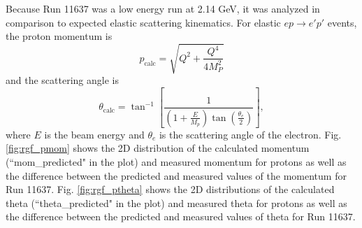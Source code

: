 Because Run 11637 was a low energy run at 2.14 GeV, it was analyzed in comparison to expected elastic scattering kinematics. For elastic $ep\rightarrow e'p'$ events, the proton momentum is
\begin{equation}
p_{\mathrm{calc}} = \sqrt{Q^2+\frac{Q^4}{4M_P^2}}
\end{equation}
and the scattering angle is
\begin{equation}
\theta_{\mathrm{calc}} = \tan^{-1} \left[ \frac{1}{ \left( 1+\frac{E}{M_p} \right) \tan \left( \frac{\theta_e}{2} \right) } \right],
\end{equation}
where $E$ is the beam energy and $\theta_e$ is the scattering angle of the electron. Fig. \ref{fig:rgf_pmom} shows the 2D distribution of the calculated momentum (``mom\_predicted" in the plot) and measured momentum for protons as well as the difference between the predicted and measured values of the momentum for Run 11637. Fig. \ref{fig:rgf_ptheta} shows the 2D distributions of the calculated theta (``theta\_predicted" in the plot) and measured theta for protons as well as the difference between the predicted and measured values of theta for Run 11637. 

